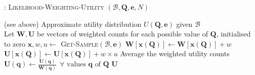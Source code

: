 \begin{algorithm}[h]
\caption{: \textsc{Likelihood-Weighting-Utility} $(\mathcal{B},\mathbf{Q}, \mathbf{e}, N)$}
\begin{algorithmic} \vspace{2mm} 
\REQUIRE (see above)
\ENSURE Approximate utility distribution $U(\mathbf{Q}, \mathbf{e})$ given $\mathcal{B}$ \\[2mm]
\STATE Let $\mathbf{W}, \mathbf{U}$ be vectors of weighted counts for each possible value of $\mathbf{Q}$, initialised to zero
\STATE $\mathbf{x}, w, u \leftarrow $ \textsc{Get-Sample}$(\mathcal{B}, \mathbf{e})$ 
\STATE $\mathbf{W}[\mathbf{x}(\mathbf{Q})] \leftarrow \mathbf{W}[\mathbf{x}(\mathbf{Q})] + w$
\STATE $\mathbf{U}[\mathbf{x}(\mathbf{Q})] \leftarrow \mathbf{U}[\mathbf{x}(\mathbf{Q})] + w \times u$
\ENDFOR
\STATE Average the weighted utility counts $\mathbf{U}(\mathbf{q}) \leftarrow \frac{\mathbf{U}(\mathbf{q})}{\mathbf{W}(\mathbf{q})} \ \ \forall \text{ values } \mathbf{q} \text{ of } \mathbf{Q}$ 
\RETURN $\mathbf{U}$  \vspace{1mm} 
\end{algorithmic}
\label{algo:lwu}
\end{algorithm}


